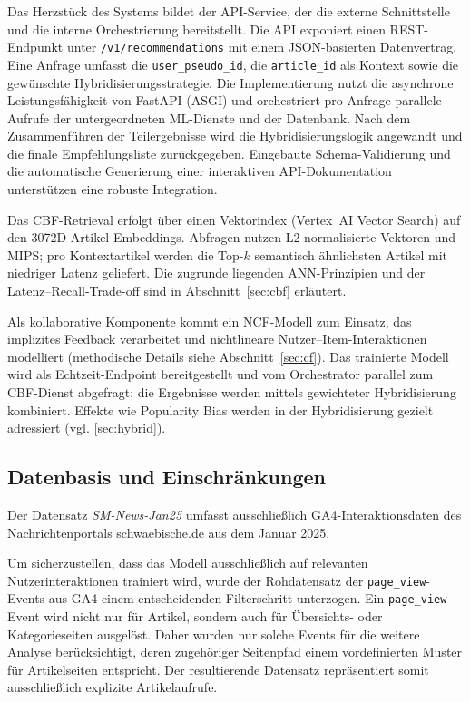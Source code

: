\label{sec:api_design}
Das Herzstück des Systems bildet der API-Service, der die externe Schnittstelle und die interne Orchestrierung 
bereitstellt. Die API exponiert einen REST-Endpunkt unter \texttt{/v1/recommendations} mit einem JSON-basierten 
Datenvertrag. Eine Anfrage umfasst die \texttt{user\_pseudo\_id}, die \texttt{article\_id} als Kontext sowie die 
gewünschte Hybridisierungsstrategie. Die Implementierung nutzt die asynchrone Leistungsfähigkeit von FastAPI 
(\ac{ASGI}) und orchestriert pro Anfrage parallele Aufrufe der untergeordneten ML-Dienste und der Datenbank. 
Nach dem Zusammenführen der Teilergebnisse wird die Hybridisierungslogik angewandt und die finale Empfehlungsliste 
zurückgegeben. Eingebaute Schema-Validierung und die automatische Generierung einer interaktiven API-Dokumentation 
unterstützen eine robuste Integration.

\label{sec:cbf_service}
Das \ac{CBF}-Retrieval erfolgt über einen Vektorindex (Vertex~AI Vector Search) auf den 
3072D-Artikel-Embeddings. Abfragen nutzen L2-normalisierte Vektoren und \ac{MIPS}; 
pro Kontextartikel werden die Top-$k$ semantisch ähnlichsten Artikel mit niedriger Latenz 
geliefert. Die zugrunde liegenden \ac{ANN}-Prinzipien und der Latenz–Recall-Trade-off 
sind in Abschnitt~\ref{sec:cbf} erläutert.

\label{sec:ncf_service}
Als kollaborative Komponente kommt ein \ac{NCF}-Modell zum Einsatz, 
das implizites Feedback verarbeitet und nichtlineare 
Nutzer–Item-Interaktionen modelliert (methodische Details siehe Abschnitt~\ref{sec:cf}). 
Das trainierte Modell wird als Echtzeit-Endpoint bereitgestellt und vom 
Orchestrator parallel zum \ac{CBF}-Dienst abgefragt; die Ergebnisse werden mittels 
gewichteter Hybridisierung kombiniert. Effekte wie Popularity Bias werden in der 
Hybridisierung gezielt adressiert (vgl. \ref{sec:hybrid}).

\subsection{Datenbasis und Einschränkungen}
\label{sec:data}
Der Datensatz \textit{SM-News-Jan25} umfasst ausschließlich \ac{GA4}-Interaktionsdaten des Nachrichtenportals 
schwaebische.de aus dem Januar 2025.


Um sicherzustellen, dass das Modell ausschließlich auf relevanten Nutzerinteraktionen trainiert wird, 
wurde der Rohdatensatz der \texttt{page\_view}-Events aus \ac{GA4} einem entscheidenden Filterschritt unterzogen. 
Ein \texttt{page\_view}-Event wird nicht nur für Artikel, sondern auch für Übersichts- oder Kategorieseiten ausgelöst. 
Daher wurden nur solche Events für die weitere Analyse berücksichtigt, deren zugehöriger Seitenpfad einem vordefinierten 
Muster für Artikelseiten entspricht. Der resultierende Datensatz repräsentiert somit ausschließlich explizite 
Artikelaufrufe.


